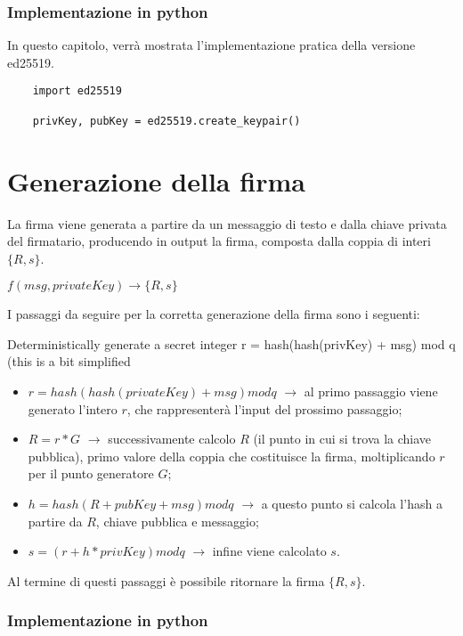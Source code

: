 \subsubsection{Implementazione in python}

In questo capitolo, verrà mostrata l'implementazione pratica della versione ed25519.

\begin{lstlisting}
	import ed25519
	
	privKey, pubKey = ed25519.create_keypair()
\end{lstlisting}

\section{Generazione della firma}

La firma viene generata a partire da un messaggio di testo e dalla chiave privata del firmatario, producendo in output la firma, composta dalla coppia di interi $\{R, s\}$.
\begin{center}
	$f(msg, privateKey) \rightarrow \{R, s\}$
\end{center}
I passaggi da seguire per la corretta generazione della firma sono i seguenti:

Deterministically generate a secret integer r = hash(hash(privKey) + msg) mod q (this is a bit simplified

\begin{itemize}
	\item $r = hash(hash(privateKey) + msg) mod q$ $\rightarrow$ al primo passaggio viene generato l'intero $r$, che rappresenterà l'input del prossimo passaggio;
	\item $R = r * G$ $\rightarrow$ successivamente calcolo $R$ (il punto in cui si trova la chiave pubblica), primo valore della coppia che costituisce la firma, moltiplicando $r$ per il punto generatore $G$; 
	\item $h = hash(R + pubKey + msg) mod q$ $\rightarrow$ a questo punto si calcola l'hash a partire da $R$, chiave pubblica e messaggio;
	\item $s = (r + h * privKey) mod q$ $\rightarrow$ infine viene calcolato $s$.
\end{itemize}

Al termine di questi passaggi è possibile ritornare la firma $\{R, s\}$.

\subsubsection{Implementazione in python}

